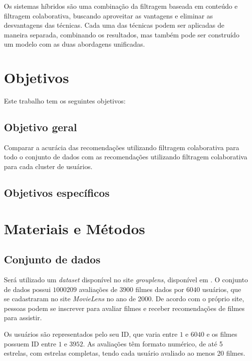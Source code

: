 \documentclass[12pt,a4paper,header]{abnt}
\begin{document}
Os sistemas híbridos são uma combinação da filtragem baseada em conteúdo e filtragem colaborativa, buscando aproveitar as vantagens e eliminar as desvantagens das técnicas\cite{shapira2011recommender}. Cada uma das técnicas podem ser aplicadas de maneira separada, combinando os resultados, mas também pode ser construído um modelo com as duas abordagens unificadas\cite{takahashi2015estudo}.

\chapter{Objetivos}

Este trabalho tem os seguintes objetivos:

\section{Objetivo geral}

Comparar a acurácia das recomendações utilizando filtragem colaborativa para todo o conjunto de dados com as recomendações utilizando filtragem colaborativa para cada cluster de usuários.

\section{Objetivos específicos}

\chapter{Materiais e Métodos}

\section{Conjunto de dados}

Será utilizado um \textit{dataset} disponível no site \textit{grouplens}, disponível em . O conjunto de dados possui $\num{1000209}$ avaliações de $3900$ filmes dados por $6040$ usuários\cite{harper2016movielens}, que se cadastraram no site \textit{MovieLens} no ano de 2000. De acordo com o próprio site, pessoas podem se inscrever para avaliar filmes e receber recomendações de filmes para assistir.

Os usuários são representados pelo seu ID, que varia entre $1$ e $6040$ e os filmes possuem ID entre $1$ e $3952$. As avaliações têm formato numérico, de até 5 estrelas, com estrelas completas, tendo cada usuário avaliado ao menos 20 filmes.
\end{document}
